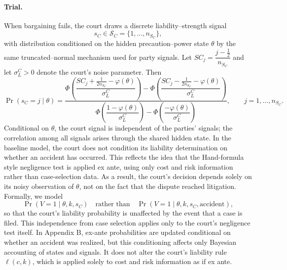 \documentclass{article}
\begin{document}
\paragraph{Trial.}
When bargaining fails, the court draws a discrete liability–strength signal
\[
s_C \in \mathcal{S}_C=\{1,\dots,n_{S_C}\},
\]
with distribution conditioned on the hidden precaution–power state $\theta$ by the same truncated–normal mechanism used for party signals. Let $SC_j=\dfrac{j-\tfrac12}{n_{S_C}}$ and let $\sigma_L^{C}>0$ denote the court’s noise parameter. Then
\[
\Pr(s_C=j\mid \theta)
=
\frac{
\Phi\!\left(\dfrac{SC_j+\tfrac{1}{2n_{S_C}}-\varphi(\theta)}{\sigma_L^{C}}\right)
-
\Phi\!\left(\dfrac{SC_j-\tfrac{1}{2n_{S_C}}-\varphi(\theta)}{\sigma_L^{C}}\right)
}{
\Phi\!\left(\dfrac{1-\varphi(\theta)}{\sigma_L^{C}}\right)
-
\Phi\!\left(\dfrac{-\varphi(\theta)}{\sigma_L^{C}}\right)
},
\qquad j=1,\dots,n_{S_C}.
\]
Conditional on $\theta$, the court signal is independent of the parties’ signals; the correlation among all signals arises through the shared hidden state. In the baseline model, the court does not condition its liability determination on whether an accident has occurred. This reflects the idea that the Hand-formula style negligence test is applied ex ante, using only cost and risk information rather than case-selection data. As a result, the court’s decision depends solely on its noisy observation of $\theta$, not on the fact that the dispute reached litigation. Formally, we model
\[
\Pr(V=1 \mid \theta,k,s_C) \quad \text{rather than} \quad \Pr(V=1 \mid \theta,k,s_C,\text{accident}),
\]
so that the court’s liability probability is unaffected by the event that a case is filed. This independence from case selection applies only to the court’s negligence test itself. In Appendix B, ex-ante probabilities are updated conditional on whether an accident was realized, but this conditioning affects only Bayesian accounting of states and signals. It does not alter the court’s liability rule $\ell(c,k)$, which is applied solely to cost and risk information as if ex ante.
\end{document}
